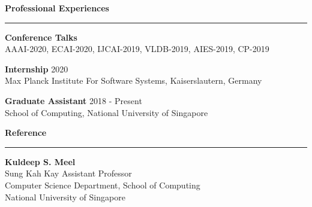 \documentclass[a4paper,11pt,final]{article}
\newcommand{\Sep}{\vspace{1.5em}}
\newcommand{\SmallSep}{\vspace{0.5em}}
\begin{document}
\Sep
\Large { \textbf{Professional Experiences}}\\
\noindent\rule{\textwidth}{1pt}
\normalsize
\textbf{Conference Talks}\\
AAAI-2020, ECAI-2020, IJCAI-2019, VLDB-2019, AIES-2019, CP-2019

\SmallSep
\textbf{Internship}
\hspace*{\fill}2020\\
 Max Planck Institute For Software Systems, Kaiserslautern, Germany

\SmallSep
\textbf{Graduate Assistant}\hspace*{\fill} 2018  - Present\\
School of Computing, National University of Singapore

\Sep
\Large{\textbf{Reference}}\\
\noindent\rule{\textwidth}{1pt}
\normalsize
\textbf{Kuldeep S. Meel}\\
Sung Kah Kay Assistant Professor\\
Computer Science Department, School of Computing\\
National University of Singapore
\end{document}
